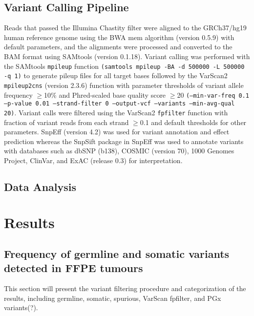 \documentclass{bmcart}
\begin{document}
\subsection*{Variant Calling Pipeline}
Reads that passed the Illumina Chastity filter were aligned to the GRCh37/hg19 human reference genome using the BWA mem algorithm (version 0.5.9) with default parameters, and the alignments were processed and converted to the BAM format using SAMtools (version 0.1.18). Variant calling was performed with the SAMtools \texttt{mpileup} function \texttt{(samtools mpileup -BA -d 500000 -L 500000 -q 1)} to generate pileup files for all target bases followed by the VarScan2 \texttt{mpileup2cns} (version 2.3.6) function with parameter thresholds of variant allele frequency $\geq$10\% and Phred-scaled base quality score $\geq$20 \texttt{(--min-var-freq 0.1 --p-value 0.01 --strand-filter 0 --output-vcf --variants --min-avg-qual 20)}. Variant calls were filtered using the VarScan2 \texttt{fpfilter} function with fraction of variant reads from each strand $\geq$0.1 and default thresholds for other parameters. SnpEff (version 4.2) was used for variant annotation and effect prediction whereas the SnpSift package in SnpEff was used to annotate variants with databases such as dbSNP (b138), COSMIC (version 70), 1000 Genomes Project, ClinVar, and ExAC (release 0.3) for interpretation.

\subsection*{Data Analysis}



\section*{Results}

\subsection*{Frequency of germline and somatic variants detected in FFPE tumours}
This section will present the variant filtering procedure and categorization of the results, including germline, somatic, spurious, VarScan fpfilter, and PGx variants(?).
\end{document}
